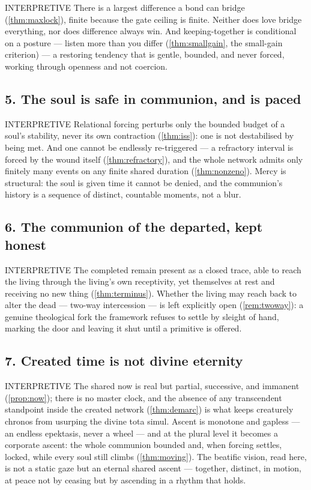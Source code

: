 \documentclass[11pt,a4paper]{article}
\def\emph#1{#1}%
\newcommand{\stInterp}{\textcolor{cInt}{\textsf{\small INTERPRETIVE}}}
\theoremstyle{definition}
\theoremstyle{plain}
\theoremstyle{remark}
\begin{document}
\stInterp\quad
There is a largest difference a bond can bridge (\ref{thm:maxlock}), finite because the gate
ceiling is finite. Neither does love bridge everything, nor does difference always win. And
keeping-together is conditional on a posture --- listen more than you differ
(\ref{thm:smallgain}, the small-gain criterion) --- a restoring tendency that is gentle,
bounded, and never forced, working through openness and not coercion.

\subsection*{5. The soul is safe in communion, and is paced}

\stInterp\quad
Relational forcing perturbs only the bounded budget of a soul's stability, never its own
contraction (\ref{thm:iss}): one is not destabilised by being met. And one cannot be
endlessly re-triggered --- a refractory interval is forced by the wound itself
(\ref{thm:refractory}), and the whole network admits only finitely many events on any finite
shared duration (\ref{thm:nonzeno}). Mercy is structural: the soul is given time it cannot be
denied, and the communion's history is a sequence of distinct, countable moments, not a blur.

\subsection*{6. The communion of the departed, kept honest}

\stInterp\quad
The completed remain present as a closed trace, able to reach the living through the living's
own receptivity, yet themselves at rest and receiving no new thing (\ref{thm:terminus}).
Whether the living may reach back to alter the dead --- two-way intercession --- is left
explicitly open (\ref{rem:twoway}): a genuine theological fork the framework refuses to settle
by sleight of hand, marking the door and leaving it shut until a primitive is offered.

\subsection*{7. Created time is not divine eternity}

\stInterp\quad
The shared now is real but partial, successive, and immanent (\ref{prop:now}); there is no
master clock, and the absence of any transcendent standpoint inside the created network
(\ref{thm:demarc}) is what keeps creaturely chronos from usurping the divine \emph{tota
simul}. Ascent is monotone and gapless --- an endless epektasis, never a wheel --- and at the
plural level it becomes a corporate ascent: the whole communion bounded and, when forcing
settles, locked, while every soul still climbs (\ref{thm:moving}). The beatific vision, read
here, is not a static gaze but an eternal shared ascent --- together, distinct, in motion, at
peace not by ceasing but by ascending in a rhythm that holds.
\end{document}
